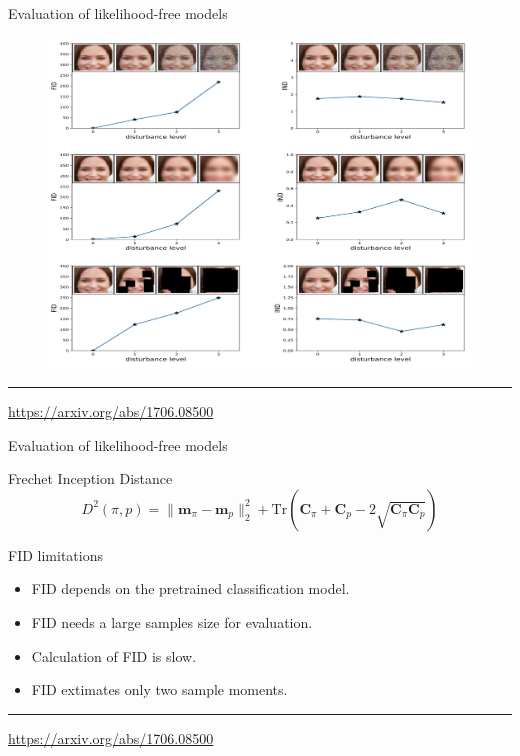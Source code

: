 \documentclass{beamer}
\newcommand{\bC}{\mathbf{C}}
\begin{document}
\begin{frame}{Evaluation of likelihood-free models}
	\begin{figure}
		\centering
		\includegraphics[width=0.9\linewidth]{figs/fid_results}
	\end{figure}
	\vfill
	\hrule\medskip 
	{\scriptsize \href{https://arxiv.org/abs/1706.08500}{https://arxiv.org/abs/1706.08500}}
\end{frame}
\begin{frame}{Evaluation of likelihood-free models}
	\begin{block}{Frechet Inception Distance}
		\vspace{-0.1cm}
		\[
		D^2 (\pi, p) = \| \mathbf{m}_{\pi} - \mathbf{m}_{p}\|_2^2 + \text{Tr} \left( \bC_{\pi} + \bC_p - 2 \sqrt{\bC_{\pi} \bC_p} \right)
		\]
	\end{block}
	\begin{block}{FID limitations}
		\begin{itemize}
			\item FID depends on the pretrained classification model.
			\item FID needs a large samples  size for evaluation.
			\item Calculation of FID is slow.
			\item FID extimates only two sample moments.
		\end{itemize}
	\end{block}
	\vspace{2cm}

	\vfill
	\hrule\medskip 
	{\scriptsize \href{https://arxiv.org/abs/1706.08500}{https://arxiv.org/abs/1706.08500}}
\end{frame}
\end{document}
